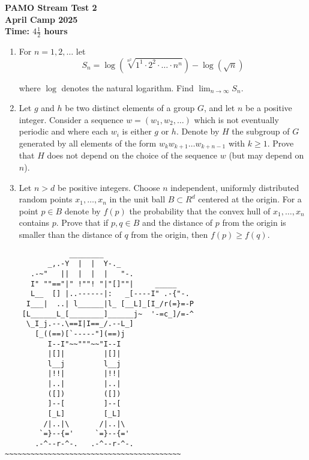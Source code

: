 \documentclass[12pt]{article}
\begin{document}
\thispagestyle{empty}

\begin{center}
  \textbf{\Large PAMO Stream Test 2}
  \\ \vspace{1em}
  \textbf{\large April Camp 2025}
  \\ \vspace{1em}
  \textbf{\large Time: $4\frac{1}{2}$ hours}
\end{center}


\begin{enumerate}[leftmargin=0pt,topsep=2\bigskipamount,itemsep=\medskipamount]
\item For $n=1,2,\ldots$ let
\[
S_n=\log\left(\sqrt[n^2]{1^1\cdot 2^2\cdot\ldots\cdot n^n}\right)-\log\left(\sqrt{n}\right)
\]

where $\log$ denotes the natural logarithm. Find $\displaystyle \lim_{n\rightarrow\infty}S_n$.

\item Let $g$ and $h$ be two distinct elements of a group $G$, and let $n$ be a positive integer. Consider a sequence $w=(w_1,w_2,\ldots)$ which is not eventually periodic and where each $w_i$ is either $g$ or $h$. Denote by $H$ the subgroup of $G$ generated by all elements of the form $w_kw_{k+1}\ldots w_{k+n-1}$ with $k\geqslant1$. Prove that $H$ does not depend on the choice of the sequence $w$ (but may depend on $n$).

\item Let $n>d$ be positive integers. Choose $n$ independent, uniformly distributed random points $x_1,\ldots,x_n$ in the unit ball $B\subset R^d$ centered at the origin. For a point $p\in B$ denote by $f(p)$ the probability that the convex hull of $x_1,\ldots,x_n$ contains $p$. Prove that if $p,q\in B$ and the distance of $p$ from the origin is smaller than the distance of $q$ from the origin, then $f(p)\geqslant f(q)$.



\end{enumerate}


\vfill
\centering
\tiny %
\begin{BVerbatim}
               ________
          _,.-Y  |  |  Y-._
      .-~"   ||  |  |  |   "-.
      I" ""=="|" !""! "|"[]""|     _____
      L__  [] |..------|:   _[----I" .-{"-.
     I___|  ..| l______|l_ [__L]_[I_/r(=}=-P
    [L______L_[________]______j~  '-=c_]/=-^
     \_I_j.--.\==I|I==_/.--L_]
       [_((==)[`-----"](==)j
          I--I"~~"""~~"I--I
          |[]|         |[]|
          l__j         l__j
          |!!|         |!!|
          |..|         |..|
          ([])         ([])
          ]--[         ]--[
          [_L]         [_L]
         /|..|\       /|..|\
        `=}--{='     `=}--{='
       .-^--r-^-.   .-^--r-^-.
~~~~~~~~~~~~~~~~~~~~~~~~~~~~~~~~~~~~~~~~~
\end{BVerbatim}
\end{document}
